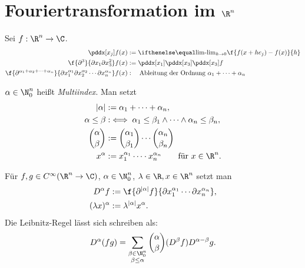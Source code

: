\section{Fouriertransformation im \texorpdfstring{$\R^n$}{R\textasciicircum n}}


\begin{nt*}[Erinnerung]
	Sei $f : \R^n \to \C$.
	\begin{align*}
		\pddx[x_j] f(x) &:= \lim_{h\to 0} \f {f(x+he_j)-f(x)}{h} \\
		\f{\partial^3 }{\partial x_1 \partial x_3^2}f(x) &:= \pddx[x_1] \pddx[x_3] \pddx[x_3] f \\
		\f{\partial^{\alpha_1 + \alpha_2 + \dotsb + \alpha_n} }{\partial x_1^{\alpha_1} \partial x_2^{\alpha_2} \dotsb \partial x_n^{\alpha_n}}f(x)  &: \quad \text{Ableitung der Ordnung $\alpha_1 + \dotsb + \alpha_n$}
	\end{align*}
\end{nt*}

\begin{df} \label{4.27}
	$\alpha \in \N_0^n$ heißt \emph{Multiindex}.
	Man setzt
	\begin{align*}
		|\alpha| &:= \alpha_1 + \dotsb + \alpha_n, \\
		\alpha \le \beta &:\iff \alpha_1 \le \beta_1 \land \dotsb \land \alpha_n \le \beta_n, \\
		\binom{\alpha}{\beta} &:= \binom{\alpha_1}{\beta_1}  \dotsb \binom{\alpha_n}{\beta_n} \\
		x^\alpha &:= x_1^{\alpha_1}  \dotsb \cdot x_n^{\alpha_n} \qquad \text{für $x\in \R^n$.}
	\end{align*}
\end{df}

\begin{ex}[Anwendung] \label{4.28}
	Für $f, g \in C^\infty (\R^n \to \C)$, $\alpha \in \N_0^n$, $\lambda \in \R, x \in \R^n$ setzt man
	\begin{align*}
		D^\alpha f &:= \f {\partial^{|\alpha|}f}{\partial x_1^{\alpha_1} \dotsb \partial x_n^{\alpha_n}},\\
		(\lambda x)^\alpha &:= \lambda^{|\alpha|} x^\alpha.
	\end{align*}
	Die Leibnitz-Regel lässt sich schreiben als:
	\[
		D^\alpha(f g) = \sum_{\substack{\beta \in \N_0^n \\ \beta \le \alpha}} \binom{\alpha}{\beta} (D^\beta f)D^{\alpha - \beta} g.
	\]
\end{ex}

